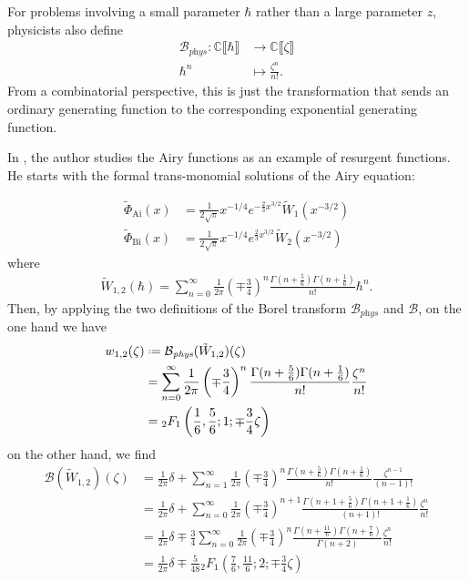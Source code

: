 \documentclass{article}
\theoremstyle{definition}
\newcommand{\maps}{\colon}
\newcommand{\C}{\mathbb{C}}
\newcommand*{\defeq}{\mathrel{\vcenter{\baselineskip0.5ex \lineskiplimit0pt
                     \hbox{\scriptsize.}\hbox{\scriptsize.}}}%
                     =}
\newcommand{\borel}{\mathcal{B}}
\theoremstyle{plain}
\begin{document}
For problems involving a small parameter $\hbar$ rather than a large parameter $z$, physicists also define
\begin{align*}
\borel_{\textit{phys}} \maps \C \llbracket \hbar \rrbracket & \to \C \llbracket \zeta \rrbracket \\
\hbar^n & \mapsto \frac{\zeta^n}{n!}.
\end{align*}
From a combinatorial perspective, this is just the transformation that sends an ordinary generating function to the corresponding exponential generating function.

In \cite{lectures-Marino}, the author studies the Airy functions as an example of resurgent functions. He starts with the formal trans-monomial solutions of the Airy equation:

\begin{align*}
\tilde{\Phi}_{\mathrm{Ai}}(x)&=\frac{1}{2\sqrt{\pi}}x^{-1/4}e^{-\tfrac{2}{3}x^{3/2}}\tilde{W}_1(x^{-3/2})\\
\tilde{\Phi}_{\mathrm{Bi}}(x)&=\frac{1}{2\sqrt{\pi}}x^{-1/4}e^{\tfrac{2}{3}x^{3/2}}\tilde{W}_2(x^{-3/2})
\end{align*}  
where 
\begin{align*}
\tilde{W}_{1,2}(\hbar)=\sum_{n=0}^{\infty}\frac{1}{2\pi}\left(\mp\frac{3}{4}\right)^{n}\frac{\Gamma(n+\frac{5}{6})\Gamma(n+\frac{1}{6})}{n!}\hbar^n.
\end{align*}
Then, by applying the two definitions of the Borel transform $\borel_{\textit{phys}}$ and $\borel$, on the one hand we have  
\begin{align*}
w_{1,2}(\zeta)&\defeq\borel_{\textit{phys}}(\tilde{W}_{1,2})(\zeta)\\
&=\sum_{n=0}^{\infty}\frac{1}{2\pi}\left(\mp\frac{3}{4}\right)^{n}\frac{\Gamma(n+\frac{5}{6})\Gamma(n+\frac{1}{6})}{n!}\frac{\zeta^n}{n!}\\
&={}_2F_1\left(\frac{1}{6},\frac{5}{6};1;\mp\frac{3}{4}\zeta\right) 
\end{align*}
on the other hand, we find
\begin{align*}
\borel(\tilde{W}_{1,2})(\zeta)&=\frac{1}{2\pi}\delta+\sum_{n=1}^{\infty} \frac{1}{2\pi}\left(\mp\frac{3}{4}\right)^{n}\frac{\Gamma(n+\frac{5}{6})\Gamma(n+\frac{1}{6})}{n!}\frac{\zeta^{n-1}}{(n-1)!}\\
&=\frac{1}{2\pi}\delta+\sum_{n=0}^{\infty} \frac{1}{2\pi}\left(\mp\frac{3}{4}\right)^{n+1}\frac{\Gamma(n+1+\frac{5}{6})\Gamma(n+1+\frac{1}{6})}{(n+1)!}\frac{\zeta^{n}}{n!}\\
&=\frac{1}{2\pi}\delta\mp\frac{3}{4}\sum_{n=0}^{\infty} \frac{1}{2\pi}\left(\mp\frac{3}{4}\right)^{n}\frac{\Gamma(n+\frac{11}{6})\Gamma(n+\frac{7}{6})}{\Gamma(n+2)}\frac{\zeta^{n}}{n!}\\
&=\frac{1}{2\pi}\delta\mp\frac{5}{48} {}_2F_1\left(\frac{7}{6},\frac{11}{6};2;\mp\frac{3}{4}\zeta\right)%
\end{align*}
\end{document}
